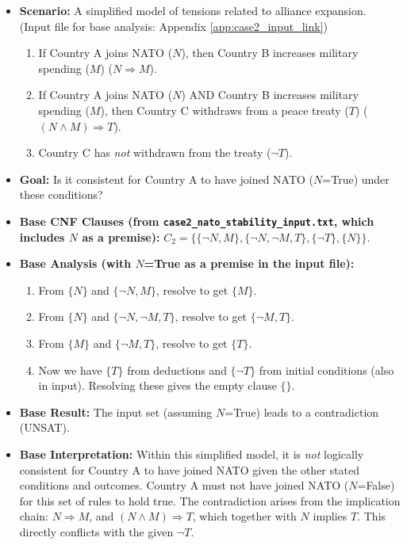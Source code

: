 \documentclass[11pt, a4paper]{article}
\begin{document}
\begin{itemize}
    \item \textbf{Scenario:} A simplified model of tensions related to alliance expansion. (Input file for base analysis: Appendix \ref{app:case2_input_link})
    \begin{enumerate}
        \item If Country A joins NATO ($N$), then Country B increases military spending ($M$) ($N \Rightarrow M$).
        \item If Country A joins NATO ($N$) AND Country B increases military spending ($M$), then Country C withdraws from a peace treaty ($T$) ($(N \wedge M) \Rightarrow T$).
        \item Country C has \textit{not} withdrawn from the treaty ($\neg T$).
    \end{enumerate}
    \item \textbf{Goal:} Is it consistent for Country A to have joined NATO ($N$=True) under these conditions?
    \item \textbf{Base CNF Clauses (from \texttt{case2\_nato\_stability\_input.txt}, which includes $N$ as a premise):} $C_2 = \{\{\neg N, M\}, \{\neg N, \neg M, T\}, \{\neg T\}, \{N\}\}$.
    \item \textbf{Base Analysis (with $N$=True as a premise in the input file):}
    \begin{enumerate}
        \item From $\{N\}$ and $\{\neg N, M\}$, resolve to get $\{M\}$.
        \item From $\{N\}$ and $\{\neg N, \neg M, T\}$, resolve to get $\{\neg M, T\}$.
        \item From $\{M\}$ and $\{\neg M, T\}$, resolve to get $\{T\}$.
        \item Now we have $\{T\}$ from deductions and $\{\neg T\}$ from initial conditions (also in input). Resolving these gives the empty clause $\{\}$.
    \end{enumerate}
    \item \textbf{Base Result:} The input set (assuming $N$=True) leads to a contradiction (UNSAT).
    \item \textbf{Base Interpretation:} Within this simplified model, it is \textit{not} logically consistent for Country A to have joined NATO given the other stated conditions and outcomes. Country A must not have joined NATO ($N$=False) for this set of rules to hold true. The contradiction arises from the implication chain: $N \Rightarrow M$, and $(N \wedge M) \Rightarrow T$, which together with $N$ implies $T$. This directly conflicts with the given $\neg T$.


\end{itemize}
\end{document}

